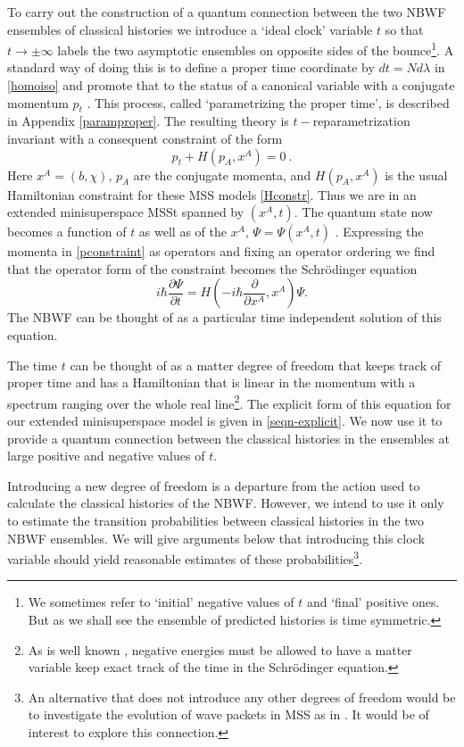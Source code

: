 \documentclass[prd,floats,superscriptaddress,eqsecnum,floatfix,nofootinbib,12pt]{revtex4}
\def\be{\begin{equation}}
\def\ee{\end{equation}}
\def\tf{}
\begin{document}
{{{{{\tf To carry out the construction of a quantum connection between the two NBWF ensembles of classical histories we introduce a `ideal clock' variable $t$} so that $t\rightarrow \pm\infty$ labels the two asymptotic ensembles on opposite sides of the bounce\footnote{We sometimes refer to `initial' negative values of $t$ and `final' positive ones. But as we shall see the ensemble of predicted histories is time symmetric.}. A standard way of doing this is to define a proper time coordinate by $dt=Nd\lambda$ in \eqref{homoiso} and promote that to the status of a canonical variable with a conjugate momentum $p_t$  \cite{Partime}.  This process, called `parametrizing the proper time', is described in Appendix \ref{paramproper}.  The resulting theory is $t-$reparametrization invariant with a consequent constraint of the form
\be
p_t + H(p_A,x^A)=0\ .
\label{pconstraint}
\ee
Here $x^A=(b,\chi)$, $p_A$ are the conjugate momenta, and $H(p_A,x^A)$ is the usual Hamiltonian constraint for these MSS models \eqref{Hconstr}.  Thus we are in an extended minisuperspace MSSt spanned by $(x^A,t)$.
The quantum state now becomes a function of $t$ as well as of the $x^A$, $\Psi=\Psi(x^A, t)$ .   
 Expressing the momenta in \eqref{pconstraint} as operators and fixing an operator ordering  we find that the operator form of the constraint becomes the Schr\"odinger equation
\be
i\hbar\frac{\partial\Psi}{\partial t} = H\left(-i\hbar\frac{\partial}{\partial x^A}, x^A\right)\Psi .
\label{pschrod}
\ee
 The NBWF can be thought of as a particular time independent solution of this equation. 

The time $t$ can be thought of as a matter degree of freedom that keeps track of proper time and has a Hamiltonian that is linear in the momentum with a spectrum ranging over the whole real line\footnote{As is well known \cite{Pauli58}, negative energies must be allowed to have a matter variable keep exact track of the time in the Schr\"odinger equation.}. The explicit form of this equation for our extended minisuperspace model is given in \eqref{seqn-explicit}. We now use it to provide a quantum connection between the classical histories in the ensembles at large positive and negative values of $t$. 

Introducing a new degree of freedom is a departure from the action used to calculate the classical histories of the NBWF.  However, we intend to use it only to estimate the transition probabilities between classical histories in the two NBWF ensembles. We will give arguments below that introducing this clock variable should yield reasonable estimates of these probabilities\footnote{An alternative that does not introduce any other degrees of freedom would be to investigate the evolution of wave packets in MSS as in \cite{Kiefer}. {\tf It would be of interest to explore this connection.}}. 

}}}}
\end{document}
